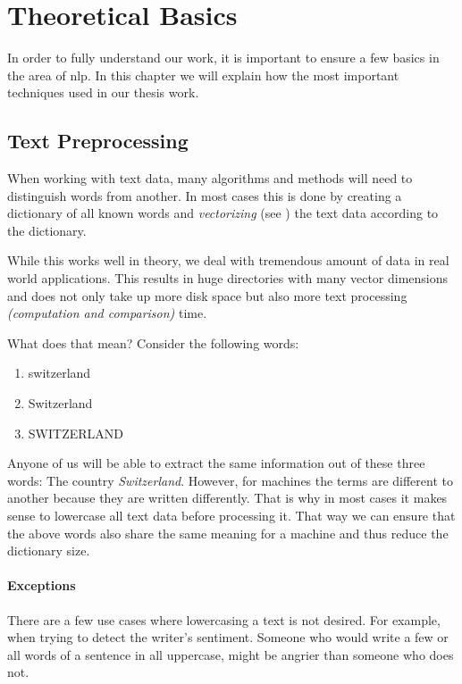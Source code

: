 \section{Theoretical Basics}
\label{sec:3_theoretical_basics}

In order to fully understand our work,
it is important to ensure a few basics in the area of \Gls{nlp}.
In this chapter we will explain how the most important techniques used in our thesis work.

\subsection{Text Preprocessing}
\label{subsec:3_text_preprocessing}

When working with text data, many algorithms and methods will need to distinguish words from another.
In most cases this is done by creating a dictionary of all known words and \textit{vectorizing}
(see ) the text data according to the dictionary.

While this works well in theory, we deal with tremendous amount of data in real world applications.
This results in huge directories with many vector dimensions and does not only take up more disk space
but also more text processing \textit{(computation and comparison)} time.

What does that mean?
Consider the following words:

\begin{enumerate}
    \item switzerland
    \item Switzerland
    \item SWITZERLAND
\end{enumerate}

Anyone of us will be able to extract the same information out of these three words:
The country \textit{Switzerland}.
However, for machines the terms are different to another because they are written differently.
That is why in most cases it makes sense to lowercase all text data before processing it.
That way we can ensure that the above words also share the same meaning
for a machine and thus reduce the dictionary size.

\paragraph{Exceptions}
There are a few use cases where lowercasing a text is not desired.
For example, when trying to detect the writer's sentiment.
Someone who would write a few or all words of a sentence in all uppercase,
might be angrier than someone who does not.

